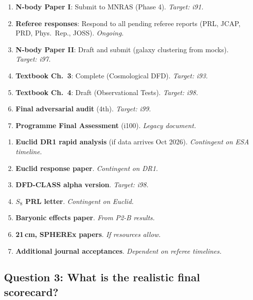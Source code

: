 \documentclass[11pt,a4paper]{article}
\begin{document}
\begin{tcolorbox}[colback=blue!5!white, colframe=dfdblue, title=\textbf{MANDATORY deliverables (i91--i100)}]
\begin{enumerate}[nosep]
\item \textbf{N-body Paper I}: Submit to MNRAS (Phase 4). \emph{Target: i91.}
\item \textbf{Referee responses}: Respond to all pending referee reports (PRL, JCAP, PRD, Phys.\ Rep., JOSS). \emph{Ongoing.}
\item \textbf{N-body Paper II}: Draft and submit (galaxy clustering from mocks). \emph{Target: i97.}
\item \textbf{Textbook Ch.\ 3}: Complete (Cosmological DFD). \emph{Target: i93.}
\item \textbf{Textbook Ch.\ 4}: Draft (Observational Tests). \emph{Target: i98.}
\item \textbf{Final adversarial audit} (4th). \emph{Target: i99.}
\item \textbf{Programme Final Assessment} (i100). \emph{Legacy document.}
\end{enumerate}
\end{tcolorbox}

\begin{tcolorbox}[colback=blue!5!white, colframe=dfdblue, title=\textbf{ASPIRATIONAL deliverables (i91--i100)}]
\begin{enumerate}[nosep]
\item \textbf{Euclid DR1 rapid analysis} (if data arrives Oct 2026). \emph{Contingent on ESA timeline.}
\item \textbf{Euclid response paper}. \emph{Contingent on DR1.}
\item \textbf{DFD-CLASS alpha version}. \emph{Target: i98.}
\item \textbf{$S_8$ PRL letter}. \emph{Contingent on Euclid.}
\item \textbf{Baryonic effects paper}. \emph{From P2-B results.}
\item \textbf{21\,cm, SPHEREx papers}. \emph{If resources allow.}
\item \textbf{Additional journal acceptances}. \emph{Dependent on referee timelines.}
\end{enumerate}
\end{tcolorbox}

\subsection{Question 3: What is the realistic final scorecard?}
\end{document}
